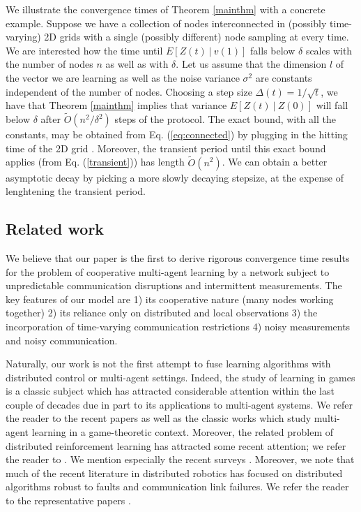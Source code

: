 \documentclass[final]{siamltex}
\begin{document}
We illustrate the convergence times of Theorem \ref{mainthm} with a concrete example. Suppose we have a collection of nodes interconnected in 
(possibly time-varying) 2D grids with a single (possibly different) node sampling at every time. We are interested how the time until $E[Z(t) ~|~ v(1)]$ falls below
$\delta$ scales with the number of nodes $n$ as well as with $\delta$. Let us assume that the dimension $l$ of the vector we are learning as well as the noise variance $\sigma^2$ are constants independent of the number of nodes. Choosing a step size $\Delta(t) = 1/\sqrt{t}$, we have that Theorem \ref{mainthm} implies that
variance $E[Z(t) ~|~ Z(0)]$ will fall below $\delta$ after $\widetilde{O}(n^2/\delta^2)$ steps of the protocol. The exact bound, with all the constants, 
may be obtained from Eq. (\ref{eq:connected}) by plugging in the hitting time of the 2D grid \cite{covertime}.  Moreover, the transient period until this exact bound applies (from Eq. (\ref{transient})) has length $\widetilde{O}(n^2)$. We can obtain a better asymptotic decay by picking a more slowly decaying stepsize, at the expense of lenghtening the transient period. 

\subsection{Related work} We believe that our paper is the first to {{{derive rigorous convergence time results for}}} the problem of cooperative multi-agent learning by a network {{{subject to}}} unpredictable communication disruptions and intermittent measurements. The key features of our model are 1) its cooperative nature (many nodes working together) 2) its reliance only on distributed and local observations 3) the incorporation of time-varying communication restrictions 4) noisy measurements and noisy communication. 

Naturally, our work is not the first attempt to fuse learning algorithms with distributed control or multi-agent settings. {{{Indeed, the study of learning in games is a classic subject which has attracted considerable attention within the last couple of decades due in part to its applications to multi-agent systems.}}} We refer the reader to the recent papers \cite{ma1, ma2, ma3, ma4, ma5, ma6, ma7, ma8, ma9, ma10, jadb-learn, jadb-more-learn} {{{as well as the classic works \cite{ma11, ma13}}}} which study multi-agent learning in a game-theoretic context.  {{{Moreover, the related problem of distributed reinforcement learning has attracted some recent attention; we refer the reader to \cite{ma11, ma12, ma14}.}}} We mention especially the recent surveys {{{\cite{ma15, ma16}}}}. {{{Moreover, we note that much of the recent literature in distributed robotics has focused on distributed algorithms robust to faults and communication link failures. We refer the reader to the representative papers \cite{r1, r2}. }}}
\end{document}
